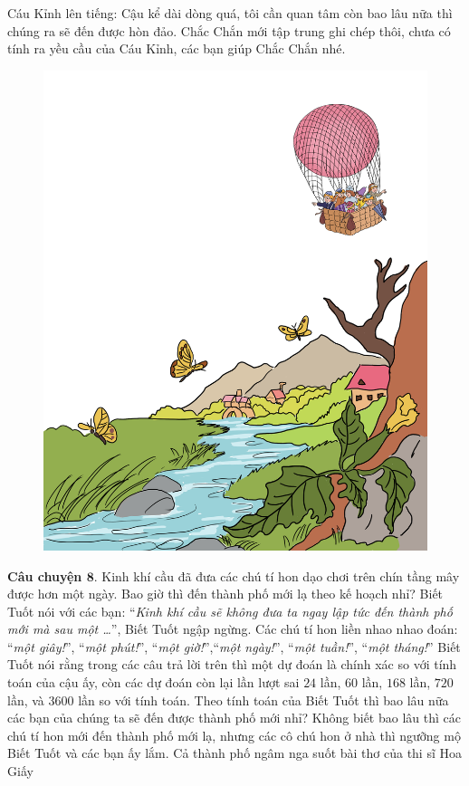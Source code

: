 	\vskip 0.1cm
	Cáu Kỉnh lên tiếng: Cậu kể dài dòng quá, tôi cần quan tâm còn bao lâu nữa thì chúng ra sẽ đến được hòn đảo. Chắc Chắn mới tập trung ghi chép thôi, chưa có tính ra yều cầu của Cáu Kỉnh, các bạn giúp Chắc Chắn nhé. 
	\begin{figure}[H]
		\centering
		\vspace*{-5pt}
		\captionsetup{labelformat= empty, justification=centering}
		\includegraphics[width=0.5\linewidth]{Hinh23_KinhKhiCau}
		\vspace*{-10pt}
	\end{figure}
	\textbf{\color{toancuabi}Câu chuyện $\pmb{8.}$} Kinh khí cầu đã đưa các chú tí hon dạo chơi trên chín tầng mây được hơn một ngày. Bao giờ thì đến thành phố mới lạ theo kế hoạch nhỉ? Biết Tuốt nói với các bạn:
	\vskip 0.1cm
	“\textit{Kinh khí cầu sẽ không đưa ta ngay lập tức đến thành phố mới mà sau một …}”, Biết Tuốt ngập ngừng. Các chú tí hon liền nhao nhao đoán: “\textit{một giây!}”, “\textit{một phút!}”, “\textit{một giờ!}”,“\textit{một ngày!}”, “\textit{một tuần!}”, “\textit{một tháng!}” Biết Tuốt nói rằng trong các câu trả lời trên thì một dự đoán là chính xác so với tính toán của cậu ấy, còn các dự đoán còn lại lần lượt sai $24$ lần, $60$ lần, $168$ lần, $720$ lần, và $3600$ lần so với tính toán. Theo tính toán của Biết Tuốt thì bao lâu nữa các bạn của chúng ta sẽ đến được thành phố mới nhỉ?
	\vskip 0.1cm
	Không biết bao lâu thì các chú tí hon mới đến thành phố mới lạ, nhưng các cô chú hon ở nhà thì ngưỡng mộ Biết Tuốt và các bạn ấy lắm. Cả thành phố ngâm nga suốt bài thơ của thi sĩ Hoa Giấy
	
